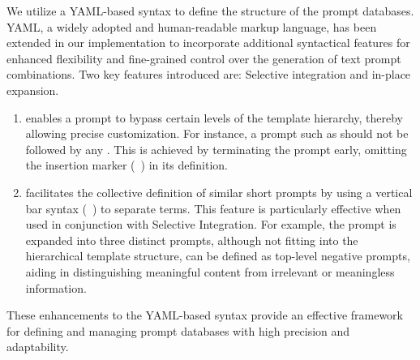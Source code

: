 We utilize a YAML-based syntax to define the structure of the prompt databases. YAML, a widely adopted and human-readable markup language, has been extended in our implementation to incorporate additional syntactical features for enhanced flexibility and fine-grained control over the generation of text prompt combinations. Two key features introduced are: Selective integration and in-place expansion. 
\begin{enumerate}[label={$\arabic*$.},nolistsep,leftmargin=*]
\item  {} enables a prompt to bypass certain levels of the template hierarchy, thereby allowing precise customization. For instance, a prompt such as  should not be followed by any . This is achieved by terminating the prompt early, omitting the insertion marker (\ie~\ttt{\footnotesize{\{\}}}) in its definition. 

\item {} facilitates the collective definition of similar short prompts by using a vertical bar syntax (\ie~\ttt{|}) to separate terms. This feature is particularly effective when used in conjunction with Selective Integration. For example, the prompt  is expanded into three distinct prompts, although not fitting into the hierarchical template structure, can be defined as top-level negative prompts, aiding in distinguishing meaningful content from irrelevant or meaningless information. 
\end{enumerate}
These enhancements to the YAML-based syntax provide an effective framework for defining and managing prompt databases with high precision and adaptability.



